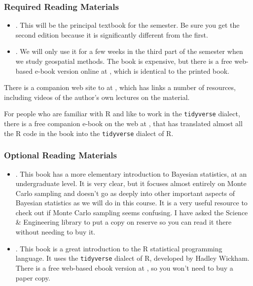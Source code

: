 \documentclass[11pt,twoside]{jgsyllabus}\usepackage[]{graphicx}\usepackage[]{xcolor}
\begin{document}
\subsubsection[Required Reading]{Required Reading Materials}
\begin{itemize}
	\item \LongRethinking. This will be the principal textbook for the semester.
	  Be sure you get the second edition because it is
	  significantly different from the first.
	\item \LongINLA. We will only use it for a few
	  weeks in the third part of the semester when we study geospatial methods.
	  The book is expensive, but there is a free web-based e-book version
	  online at \INLAURL, which is identical to the printed book.
\end{itemize}
\begin{sloppypar}
There is a companion web site to \emph{\Rethinking\/} at \RethinkingWebSite,
which has links a number of resources, including videos of the author's own
lectures on the material.
\end{sloppypar}

For people who are familiar with R and like to work in the \texttt{tidyverse}
dialect, there is a free companion e-book on the web at \TidyRethinkingBook,
that has translated almost all the R code in the book into the \texttt{tidyverse}
dialect of R.

\subsubsection[Optional Books]{Optional Reading Materials}
\begin{itemize}
  \item \LongDBDA. This book has a more elementary introduction to Bayesian
    statistics, at an undergraduate level. It is very clear, but it
    focuses almost entirely on Monte Carlo sampling and doesn't go as deeply
    into other important aspects of Bayesian statistics as we will do in this
    course.
    It is a very useful resource to check out if Monte Carlo sampling seems
    confusing. I have asked the Science \& Engineering library to put a copy on
    reserve so you can read it there without needing to buy it.
  \item \LongWickham. This book is a great introduction to the R statistical
    programming language. It uses the \texttt{tidyverse} dialect of R,
    developed by Hadley Wickham.
    There is a free web-based ebook version at
    \WickhamURL, so you won't need to buy a paper copy.
\end{itemize}
\end{document}
